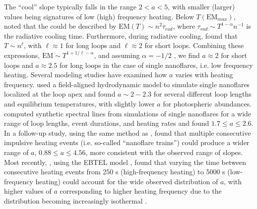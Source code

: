 The ``cool'' \dem{} slope typically falls in the range $2<a<5$, with smaller (larger) values being signatures of low (high) frequency heating. Below $T(\mathrm{EM}_{max})$, \citet{cargill_implications_1994} noted that the \dem{} could be described by $\mathrm{EM}(T)\sim n^2\tau_{rad}$, where $\tau_{rad}\sim T^{1-\alpha}n^{-1}$ is the radiative cooling time. Furthermore, during radiative cooling, \citet{bradshaw_cooling_2010} found that $T\sim n^{\ell}$, with $\ell\approx1$ for long loops and $\ell\approx2$ for short loops. Combining these expressions, $\mathrm{EM}\sim T^{1+1/\ell-\alpha}$, and assuming $\alpha=-1/2$ \citep[i.e. using the radiative losses of][]{rosner_dynamics_1978}, we find $a\approx2$ for short loops and $a\approx2.5$ for long loops in the case of single nanoflares, i.e. low frequency heating. Several modeling studies have examined how $a$ varies with heating frequency. \citet{mulu-moore_can_2011} used a field-aligned hydrodynamic model to simulate single nanoflares localized at the loop apex and found $a\sim2-2.3$ for several different loop lengths and equilibrium temperatures, with slightly lower $a$ for photospheric abundances. \citet{bradshaw_diagnosing_2012} computed synthetic spectral lines from simulations of single nanoflares for a wide range of loop lengths, event durations, and heating rates and found $1.7\le a\le2.6$. In a follow-up study, \citet{reep_diagnosing_2013} using the same method as \citeauthor{bradshaw_diagnosing_2012}, found that multiple consecutive impulsive heating events (i.e. so-called ``nanoflare trains'') could produce a wider range of $a$, $0.88\le a\le4.56$, more consistent with the observed range of slopes. Most recently, \citet{cargill_active_2014}, using the EBTEL model \citep{klimchuk_highly_2008,cargill_enthalpy-based_2012,cargill_enthalpy-based_2012-1}, found that varying the time between consecutive heating events from 250 s (high-frequency heating) to 5000 s (low-frequency heating) could account for the wide observed distribution of $a$, with higher values of $a$ corresponding to higher heating frequency due to the \dem{} distribution becoming increasingly isothermal \citep[see also][]{barnes_inference_2016-1}. 

